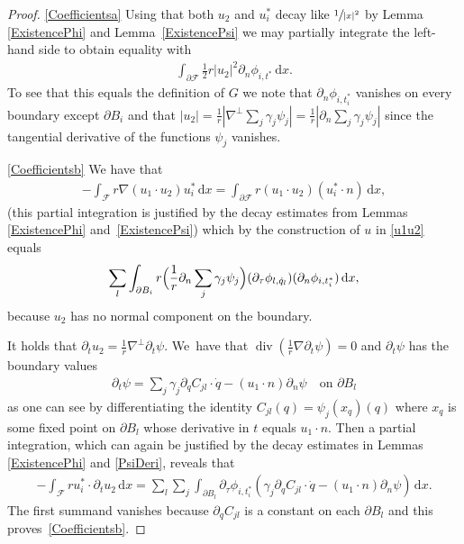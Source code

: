 \documentclass[10pt]{amsart}
\theoremstyle{definition}
\renewcommand{\div}{\operatorname{div}}
\newcommand\eq{=}
\newcommand\dd{\,\mathrm{d}}
\newcommand\dx{\dd x}
\let\de\partial
\begin{document}
\skpt
\begin{proof}

\eqref{Coefficientsa}
Using that both $u_2$ and $u_i^*$ decay like $\sfrac{1}{|x|^2}$ by Lemma \ref{ExistencePhi} and Lemma~\ref{ExistencePsi} we may partially integrate the left-hand side to obtain equality with
\begin{align}
\int_{\de \mathcal{F}}\frac{1}{2}r|u_2|^2\de_n \phi_{i,t^*}\dx.
\end{align}
To see that this equals the definition of $G$ we note that $\de_n \phi_{i,t_i^*}$ vanishes on every boundary except $\de B_i$ and that $|u_2|=\frac{1}{r}|\nabla^\perp\sum_j \gamma_j\psi_j|=\frac{1}{r}|\de_n \sum_j \gamma_j\psi_j|$ since the tangential derivative of the functions $\psi_j$ vanishes.

\eqref{Coefficientsb}
We have that
\begin{align*}
-\int_\mathcal{F} r\nabla(u_1\cdot u_2)u_i^*\dx\eq\int_{\de \mathcal{F}}r(u_1\cdot u_2)(u_i^*\cdot n)\dx,
\end{align*}
(this partial integration is justified by the decay estimates from Lemmas \ref{ExistencePhi} and~\ref{ExistencePsi}) which by the construction of $u$ in \eqref{u1u2} equals
\begin{align*}
\sum_{l}\int_{\de B_i}r\Bigl(\frac{1}{r}\de_n\sum_j\gamma_j\psi_j\Bigr)(\de_\tau \phi_{l,\dot{q}_l})(\de_n \phi_{i,t_i^*})\dx,
\end{align*}
because $u_2$ has no normal component on the boundary.

It holds that $\de_tu_2=\frac{1}{r}\nabla^\perp\de_t\psi$. We~have that $\div(\frac{1}{r}\nabla\de_t\psi)=0$ and $\de_t\psi$ has the boundary values
\begin{align*}
\de_t\psi\eq\sum_j\gamma_j\de_{q} C_{jl}\cdot\dot{q}-(u_1\cdot n)\de_n\psi\quad\text{on $\de B_l$}
\end{align*}
as one can see by differentiating the identity $C_{jl}(q)=\psi_j(x_q)(q)$ where $x_q$ is some fixed point on $\de B_l$ whose derivative in $t$ equals $u_1\cdot n$.
Then a partial integration, which can again be justified by the decay estimates in Lemmas \ref{ExistencePhi} and \ref{PsiDeri}, reveals that
\begin{align*}
-\int_{\mathcal{F}}ru_i^*\cdot\de_tu_2\dx\eq\sum_l\sum_j\int_{\de B_l} \de_\tau\phi_{i,t_i^*}\left(\gamma_j\de_{q} C_{jl}\cdot\dot{q}-(u_1\cdot n)\de_n\psi\right)\dx.
\end{align*}
The first summand vanishes because $\de_q C_{jl}$ is a constant on each $\de B_l$ and this proves~\eqref{Coefficientsb}.


\end{proof}
\end{document}
